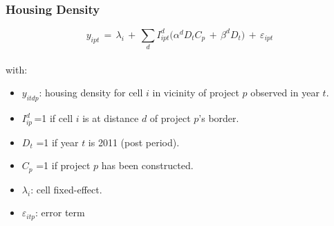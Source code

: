 \documentclass[aspectratio=32]{beamer}
\begin{document}
\begin{frame}
\frametitle{Housing Density}

\begin{equation*}
y_{ipt} \, = \, \lambda_i \, + \, \sum\limits_{d} I^d_{ipt}\Big( \alpha^d D_tC_p \, + \, \beta^dD_t\Big) \, + \, \varepsilon_{ipt}
\end{equation*}
\\with:
\begin{itemize}
\item $y_{itdp}$: housing density for cell $i$ in vicinity of project $p$ observed in year $t$.
\item $I^d_{ip}$\,=1 if cell $i$ is at distance $d$ of project $p$'s border.
\item $D_{t}\,\,$=1 if year $t$ is 2011 (post period). 
\item $C_{p}\,\,$=1 if project $p$ has been constructed.
\item $\lambda_i$: cell fixed-effect.
\item $\varepsilon_{itp}$: error term
\end{itemize}

\end{frame}

\end{document}
